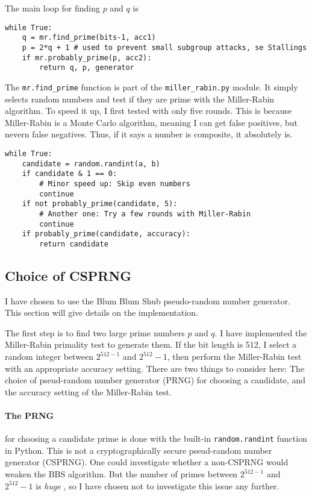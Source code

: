 \documentclass[a4paper,english,12pt]{article}
\begin{document}
The main loop for finding $p$ and $q$ is
\begin{lstlisting}[caption={Finding Diffie-Hellman parameters}, label=verb:dh.find]
while True:
    q = mr.find_prime(bits-1, acc1)
    p = 2*q + 1 # used to prevent small subgroup attacks, se Stallings
    if mr.probably_prime(p, acc2):
        return q, p, generator
\end{lstlisting}
The \texttt{mr.find\_{}prime} function is part of the \texttt{miller\_{}rabin.py}
module.  It simply selects random numbers and test if they are prime with the
Miller-Rabin algorithm. To speed it up, I first tested with only five rounds.
This is because Miller-Rabin is a Monte Carlo algorithm, meaning I can get
false positives, but nevern false negatives. Thus, if it says a number is
composite, it absolutely is.
\begin{lstlisting}[caption={Finding prime numbres}, label=verb:dh.primes]
while True:
    candidate = random.randint(a, b)
    if candidate & 1 == 0:
        # Minor speed up: Skip even numbers
        continue
    if not probably_prime(candidate, 5):
        # Another one: Try a few rounds with Miller-Rabin
        continue
    if probably_prime(candidate, accuracy):
        return candidate
\end{lstlisting}

\subsection{Choice of CSPRNG}
I have chosen to use the Blum Blum Shub \cite{bbs} pseudo-random number
generator. This section will give details on the implementation.

The first step is to find two large prime numbers $p$ and $q$. I have
implemented the Miller-Rabin \cite{miller.rabin} primality test to generate
them.
%
If the bit length is 512, I select a random integer between $2^{512-1}$ and
$2^{512}-1$, then perform the Miller-Rabin test with an appropriate accuracy
setting. There are two things to consider here: The choice of pseud-random
number generator (PRNG) for choosing a candidate, and the accuracy setting of
the Miller-Rabin test.

\paragraph{The PRNG} for choosing a candidate prime is done with the built-in
\texttt{random.randint} function in Python. This is not a cryptographically
secure pseud-random number generator (CSPRNG). One could investigate whether a
non-CSPRNG would weaken the BBS algorithm. But the number of primes between
$2^{512-1}$ and $2^{512}-1$ is \textit{huge} \cite{wiki:prime.counting}, so I
have chosen not to investigate this issue any further.
\end{document}
